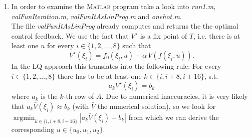 \documentclass[12pt,pdftex,a4paper]{scrartcl}
\DeclareMathOperator*{\argmin}{argmin}
\begin{document}
\begin{enumerate}
	\item In order to examine the \textsc{Matlab} program take a look into \emph{run1.m}, \emph{valFunIteration.m}, \emph{valFunItAsLinProg.m} and \emph{onehot.m}.\\
	The file \emph{valFunItAsLinProg} already computes and returns the the optimal control feedback. We use the fact that $V^\star$ is a fix point of $T$, i.e. there is at least one $u$ for every $i \in \{1,2,\ldots ,8\}$ such that
	\begin{equation*}
		V^\star(\xi_i) =  f_0(\xi_i,u) + \alpha\,V(f(\xi_i,u)).
	\end{equation*}
	In the LQ approach this translates into the following rule: For every $i \in \{1,2,\ldots ,8\}$ there has to be at least one $k \in \{i, i+8, i+16\}$, s.t.
	\begin{equation*}
		a_k V^\star(\xi_i) = b_k
	\end{equation*}
	where $a_k$ is the $k$-th row of $A$. Due to numerical inaccuracies, it is very likely that $a_k \bar{V}(\xi_i) \approx b_k$ (with $\bar{V}$ the numerical solution), so we look for $\argmin_{k \in \{i, i+8, i+16\}} |a_k \bar{V}(\xi_i) - b_k|$ from which we can derive the corresponding $u\in\{u_0,u_1,u_2\}$.
\end{enumerate}


\newpage
\end{document}
